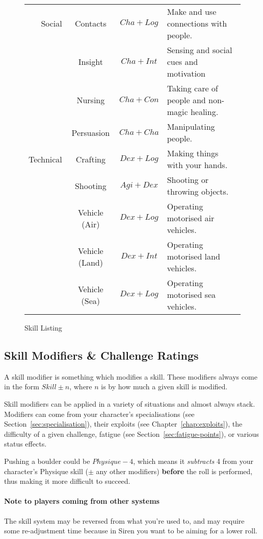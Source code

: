 \begin{figure}
\begin{tabular}{r | c | c | l}
    Social    & Contacts         & $Cha+Log$ & Make and use connections with people.         \\
              & Insight          & $Cha+Int$ & Sensing and social cues and motivation        \\
              & Nursing          & $Cha+Con$ & Taking care of people and non-magic healing.  \\
              & Persuasion       & $Cha+Cha$ & Manipulating people.                          \\\hline
    Technical & Crafting         & $Dex+Log$ & Making things with your hands.                \\
              & Shooting         & $Agi+Dex$ & Shooting or throwing objects.                 \\
              & Vehicle (Air)    & $Dex+Log$ & Operating motorised air vehicles.             \\
              & Vehicle (Land)   & $Dex+Int$ & Operating motorised land vehicles.            \\
              & Vehicle (Sea)    & $Dex+Log$ & Operating motorised sea vehicles.             \\
\end{tabular}
\caption{Skill Listing}
\label{fig:skills}
\end{figure}

\subsection{Skill Modifiers \& Challenge Ratings}
A skill modifier is something which modifies a skill.
These modifiers always come in the form $Skill \pm n$, where $n$ is by how much a given skill is modified.

Skill modifiers can be applied in a variety of situations and almost always stack.
Modifiers can come from your character's specialisations (see Section~\ref{sec:specialisation}), their exploits (see Chapter~\ref{chap:exploits}), the difficulty of a given challenge, fatigue (see Section~\ref{sec:fatigue-points}), or various status effects.

Pushing a boulder could be $\mathit{Physique} - 4$, which means it \textit{subtracts} 4 from your character's Physique skill ($\pm$ any other modifiers) \textbf{before} the roll is performed, thus making it more difficult to succeed.

\paragraph{Note to players coming from other systems} The skill system may be reversed from what you're used to, and may require some re-adjustment time because in Siren you want to be aiming for a lower roll.

